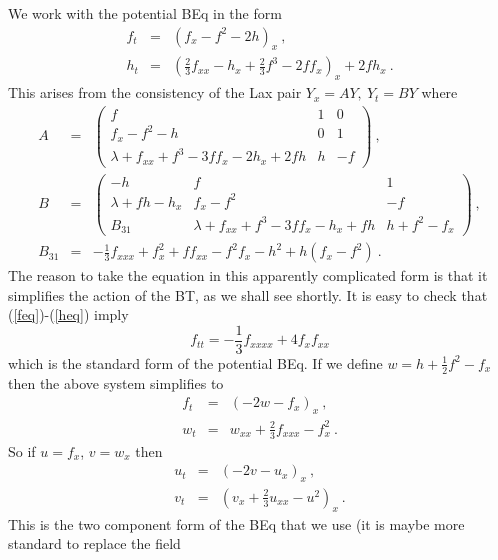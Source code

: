 \documentclass[12pt]{article}
\begin{document}
We work with the potential BEq in the form 
\begin{eqnarray}
f_t &=& \left( f_{x} - f^2 - 2h \right)_x \ ,  \label{feq}\\
h_t &=& \left( {\textstyle{\frac23}} f_{xx} - h_{x} + {\textstyle{\frac23}}f^3 - 2ff_{x} \right)_x  + 2fh_x \ .
\label{heq}
\end{eqnarray}
This arises from the consistency of the Lax pair $Y_x = A Y,\  Y_t=B Y$  where 
\begin{eqnarray*}
A  &=& \left( \begin{array}{ccc}
  f & 1 & 0  \\
  f_x - f^2 - h & 0 & 1 \\
  \lambda + f_{xx} + f^3 - 3ff_x  - 2h_x + 2fh  &   h &  -f  
     \end{array} \right) \ , \\ 
B  &=& \left( \begin{array}{ccc}
  -h & f & 1  \\
  \lambda+fh - h_x & f_x-f^2 & -f  \\
  B_{31}  & \lambda + f_{xx} +f^3 -3ff_x - h_x + fh &  h+f^2-f_x 
\end{array} \right) \ , \\
B_{31} &=& -{\textstyle{\frac13}} f_{xxx} + f_x^2 + ff_{xx} - f^2f_x - h^2 + h(f_x-f^2) \ . 
\end{eqnarray*}
The reason to take the equation in this apparently complicated form is that it simplifies the action of
the BT, as we shall see shortly.  It is easy to check that (\ref{feq})-(\ref{heq}) imply  
\begin{equation} f_{tt} = -{\textstyle{\frac13}}  f_{xxxx} + 4f_x f_{xx}  \label{pb}\end{equation} 
which is the standard form of the potential BEq. If we define  $w = h + {\textstyle{\frac12}} f^2 -f_x$ then
the above system simplifies to
\begin{eqnarray*}
  f_t &=&  \left(-2 w - f_x \right)_x \ , \\
  w_t &=&  w_{xx} + {\textstyle{\frac23}} f_{xxx} - f_x^2  \ .
\end{eqnarray*}
So if $u=f_x$, $v=w_x$ then 
\begin{eqnarray}
  u_t &=&  \left(-2v-u_x \right)_x \ ,  \label{ueq}\\
  v_t &=&  \left(v_x + {\textstyle{\frac23}} u_{xx} -u^2 \right)_x  \ . \label{veq}
\end{eqnarray}
This is the two component form of the BEq that we use (it is maybe more standard to replace the field
\end{document}
